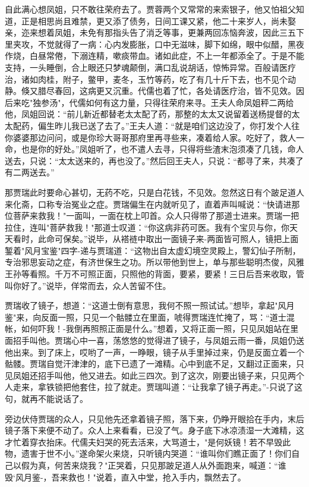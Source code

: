 自此满心想凤姐，只不敢往荣府去了。贾蓉两个又常常的来索银子，他又怕祖父知道，正是相思尚且难禁，更又添了债务，日间工课又紧，他二十来岁人，尚未娶亲，迩来想着凤姐，未免有那指头告了消乏等事，更兼两回冻恼奔波，因此三五下里夹攻，不觉就得了一病：心内发膨胀，口中无滋味，脚下如绵，眼中似醋，黑夜作烧，白昼常倦，下溺连精，嗽痰带血。诸如此症，不上一年都添全了。于是不能支持，一头睡倒，合上眼还只梦魂颠倒，满口乱说胡话，惊怖异常。百般请医疗治，诸如肉桂，附子，鳖甲，麦冬，玉竹等药，吃了有几十斤下去，也不见个动静。倏又腊尽春回，这病更又沉重。代儒也着了忙，各处请医疗治，皆不见效。因后来吃"独参汤"，代儒如何有这力量，只得往荣府来寻。王夫人命凤姐秤二两给他，凤姐回说：“前儿新近都替老太太配了药，那整的太太又说留着送杨提督的太太配药，偏生昨儿我已送了去了。”王夫人道：“就是咱们这边没了，你打发个人往你婆婆那边问问，或是你珍大哥哥那府里再寻些来，凑着给人家。吃好了，救人一命，也是你的好处。”凤姐听了，也不遣人去寻，只得将些渣末泡须凑了几钱，命人送去，只说：“太太送来的，再也没了。”然后回王夫人，只说：“都寻了来，共凑了有二两送去。”

那贾瑞此时要命心甚切，无药不吃，只是白花钱，不见效。忽然这日有个跛足道人来化斋，口称专治冤业之症。贾瑞偏生在内就听见了，直着声叫喊说：“快请进那位菩萨来救我！"一面叫，一面在枕上叩首。众人只得带了那道士进来。贾瑞一把拉住，连叫"菩萨救我！"那道士叹道：“你这病非药可医。我有个宝贝与你，你天天看时，此命可保矣。”说毕，从褡裢中取出一面镜子来-两面皆可照人，镜把上面錾着"风月宝鉴"四字-递与贾瑞道：“这物出自太虚幻境空灵殿上，警幻仙子所制，专治邪思妄动之症，有济世保生之功。所以带他到世上，单与那些聪明杰俊，风雅王孙等看照。千万不可照正面，只照他的背面，要紧，要紧！三日后吾来收取，管叫你好了。”说毕，佯常而去，众人苦留不住。

贾瑞收了镜子，想道：“这道士倒有意思，我何不照一照试试。”想毕，拿起"风月鉴"来，向反面一照，只见一个骷髅立在里面，唬得贾瑞连忙掩了，骂：“道士混帐，如何吓我！-我倒再照照正面是什么。”想着，又将正面一照，只见凤姐站在里面招手叫他。贾瑞心中一喜，荡悠悠的觉得进了镜子，与凤姐云雨一番，凤姐仍送他出来。到了床上，哎哟了一声，一睁眼，镜子从手里掉过来，仍是反面立着一个骷髅。贾瑞自觉汗津津的，底下已遗了一滩精。心中到底不足，又翻过正面来，只见凤姐还招手叫他，他又进去。如此三四次。到了这次，刚要出镜子来，只见两个人走来，拿铁锁把他套住，拉了就走。贾瑞叫道：“让我拿了镜子再走。”-只说了这句，就再不能说话了。

旁边伏侍贾瑞的众人，只见他先还拿着镜子照，落下来，仍睁开眼拾在手内，末后镜子落下来便不动了。众人上来看看，已没了气。身子底下冰凉渍湿一大滩精，这才忙着穿衣抬床。代儒夫妇哭的死去活来，大骂道士，"是何妖镜！若不早毁此物，遗害于世不小。”遂命架火来烧，只听镜内哭道：“谁叫你们瞧正面了！你们自己以假为真，何苦来烧我？"正哭着，只见那跛足道人从外面跑来，喊道：“谁毁`风月鉴-，吾来救也！"说着，直入中堂，抢入手内，飘然去了。

